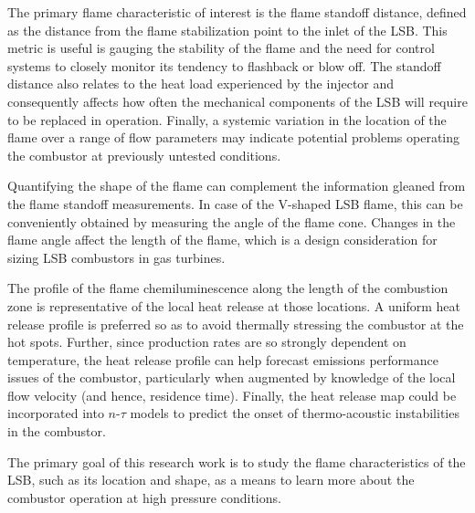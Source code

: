 The primary flame characteristic of interest is the flame standoff distance, defined as the distance from the flame stabilization point to the inlet of the LSB.
This metric is useful is gauging the stability of the flame and the need for control systems to closely monitor its tendency to flashback or blow off.
The standoff distance also relates to the heat load experienced by the injector and consequently affects how often the mechanical components of the LSB will require to be replaced in operation.
Finally, a systemic variation in the location of the flame over a range of flow parameters may indicate potential problems operating the combustor at previously untested conditions.

Quantifying the shape of the flame can complement the information gleaned from the flame standoff measurements.
In case of the V-shaped LSB flame, this can be conveniently obtained by measuring the angle of the flame cone.
Changes in the flame angle affect the length of the flame, which is a design consideration for sizing LSB combustors in gas turbines.

The profile of the flame chemiluminescence along the length of the combustion zone is representative of the local heat release at those locations.
A uniform heat release profile is preferred so as to avoid thermally stressing the combustor at the hot spots.
Further, since  production rates are so strongly dependent on temperature, the heat release profile can help forecast emissions performance issues of the combustor, particularly when augmented by knowledge of the local flow velocity (and hence, residence time).
Finally, the heat release map could be incorporated into \(n\)-\(\tau\) models to predict the onset of thermo-acoustic instabilities in the combustor.

The primary goal of this research work is to study the flame characteristics of the LSB, such as its location and shape, as a means to learn more about the combustor operation at high pressure conditions.

